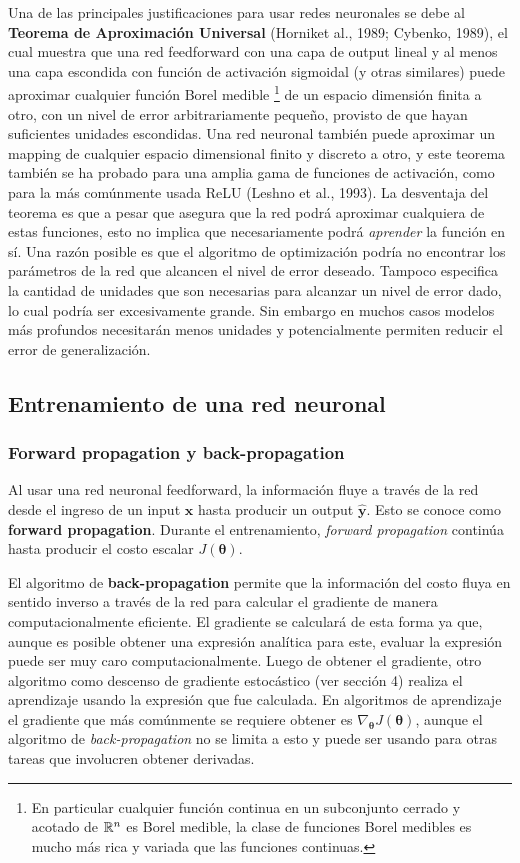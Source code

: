 Una de las principales justificaciones para usar redes neuronales se debe al \textbf{Teorema de Aproximaci\'on Universal} (Horniket al., 1989; Cybenko, 1989), el cual muestra que una red feedforward con una capa de output lineal y al menos una capa escondida con funci\'on de activaci\'on sigmoidal (y otras similares) puede aproximar cualquier funci\'on Borel medible \footnote{En particular cualquier funci\'on continua en un subconjunto cerrado y acotado de $\mathbb{R}^{n}$ es Borel medible, la clase de funciones Borel medibles es mucho más rica y variada que las funciones continuas.} de un espacio dimensión finita a otro, con un nivel de error arbitrariamente pequeño, provisto de que hayan suficientes unidades escondidas. Una red neuronal tambi\'en puede aproximar un mapping de cualquier espacio dimensional finito y discreto a otro, y este teorema tambi\'en se ha probado para una amplia gama de funciones de activaci\'on, como para la m\'as com\'unmente usada ReLU (Leshno et al., 1993). La desventaja del teorema es que a pesar que asegura que la red podr\'a aproximar cualquiera de estas funciones, esto no implica que necesariamente podr\'a \textit{aprender} la funci\'on en sí. Una razón posible es que el algoritmo de optimizaci\'on podr\'ia no encontrar los par\'ametros de la red que alcancen el nivel de error deseado. Tampoco especifica la cantidad de unidades que son necesarias para alcanzar un nivel de error dado, lo cual podr\'ia ser excesivamente grande. Sin embargo en muchos casos modelos m\'as profundos necesitar\'an menos unidades y potencialmente permiten reducir el error de generalizaci\'on.

\subsection{Entrenamiento de una red neuronal}

\subsubsection{Forward propagation y back-propagation}

Al usar una red neuronal feedforward, la informaci\'on fluye a trav\'es de la red desde el ingreso de un input $\bm{x}$ hasta producir un output $\hat{\bm{y}}$. Esto se conoce como \textbf{forward propagation}. Durante el entrenamiento, \textit{forward propagation} contin\'ua hasta producir el costo escalar $J(\bm{\theta})$.

El algoritmo de \textbf{back-propagation} permite que la informaci\'on del costo fluya en sentido inverso a trav\'es de la red para calcular el gradiente de manera computacionalmente eficiente. El gradiente se calculará de esta forma ya que, aunque es posible obtener una expresi\'on anal\'itica para este, evaluar la expresi\'on puede ser muy caro computacionalmente. Luego de obtener el gradiente, otro algoritmo como descenso de gradiente estoc\'astico (ver secci\'on 4) realiza el aprendizaje usando la expresión que fue calculada. En algoritmos de aprendizaje el gradiente que m\'as com\'unmente se requiere obtener es $\nabla_{\bm{\theta}}J(\bm{\theta})$, aunque el algoritmo de \textit{back-propagation} no se limita a esto y puede ser usando para otras tareas que involucren obtener derivadas.


